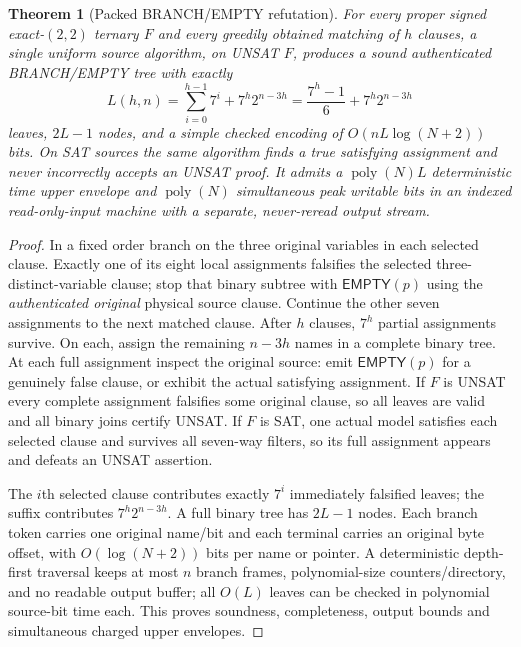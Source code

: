 \documentclass[11pt]{article}
\newtheorem{theorem}{Theorem}
\begin{document}
\begin{theorem}[Packed BRANCH/EMPTY refutation]\label{th:pack}
For every proper signed exact-$(2,2)$ ternary $F$ and every greedily obtained matching of $h$ clauses, a single uniform source algorithm, on UNSAT $F$, produces a sound authenticated BRANCH/EMPTY tree with exactly
\[
L(h,n)=\sum_{i=0}^{h-1}7^i+7^h2^{n-3h}
=\frac{7^h-1}{6}+7^h2^{n-3h}\tag{2}
\]
leaves, $2L-1$ nodes, and a simple checked encoding of $O(nL\log(N+2))$ bits. On SAT sources the same algorithm finds a true satisfying assignment and never incorrectly accepts an UNSAT proof. It admits a $\operatorname{poly}(N)L$ deterministic time upper envelope and $\operatorname{poly}(N)$ simultaneous peak writable bits in an indexed read-only-input machine with a separate, never-reread output stream.
\end{theorem}
\begin{proof}
In a fixed order branch on the three original variables in each selected clause. Exactly one of its eight local assignments falsifies the selected three-distinct-variable clause; stop that binary subtree with $\mathsf{EMPTY}(p)$ using the \emph{authenticated original} physical source clause. Continue the other seven assignments to the next matched clause. After $h$ clauses, $7^h$ partial assignments survive. On each, assign the remaining $n-3h$ names in a complete binary tree. At each full assignment inspect the original source: emit $\mathsf{EMPTY}(p)$ for a genuinely false clause, or exhibit the actual satisfying assignment. If $F$ is UNSAT every complete assignment falsifies some original clause, so all leaves are valid and all binary joins certify UNSAT. If $F$ is SAT, one actual model satisfies each selected clause and survives all seven-way filters, so its full assignment appears and defeats an UNSAT assertion.

The $i$th selected clause contributes exactly $7^i$ immediately falsified leaves; the suffix contributes $7^h2^{n-3h}$. A full binary tree has $2L-1$ nodes. Each branch token carries one original name/bit and each terminal carries an original byte offset, with $O(\log(N+2))$ bits per name or pointer. A deterministic depth-first traversal keeps at most $n$ branch frames, polynomial-size counters/directory, and no readable output buffer; all $O(L)$ leaves can be checked in polynomial source-bit time each. This proves soundness, completeness, output bounds and simultaneous charged upper envelopes.
\end{proof}
\end{document}
